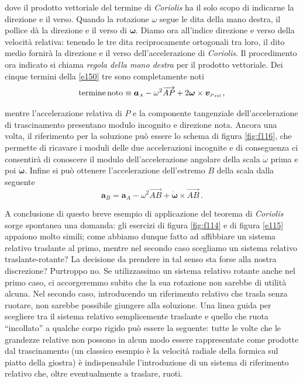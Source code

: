 \noindent dove il prodotto vettoriale del
termine di {\em Coriolis} ha il solo scopo di indicarne la direzione e il verso. 
Quando la rotazione $\omega$ segue 
le dita della mano destra, il pollice d\`a la direzione e il verso
di $\bm \omega$. Diamo  ora all'indice direzione e verso della velocit\`a
relativa: tenendo le tre dita reciprocamente ortogonali tra
loro, il dito medio fornir\`a la direzione e il verso
dell'accelerazione di {\em Coriolis}. Il procedimento ora indicato
si chiama {\em regola della mano destra}
per il prodotto vettoriale.
Dei cinque termini della \ref{e150} tre sono completamente noti
\begin{equation}
{\rm termine\, noto}\equiv
{{\bm a}_{\scriptscriptstyle{A}}}
-\omega^2 \overrightarrow{AP} + 
2{\bm \omega}\times
{{\bm v}_{\scriptscriptstyle{P}}}_{\scriptscriptstyle{{\rm rel}}}\,,
\label{e151}
\end{equation}

\noindent mentre l'accelerazione relativa di $P$ e la componente tangenziale dell'accelerazione di trascinamento presentano modulo incognito
e direzione nota.
Ancora una volta, il riferimento per la soluzione
pu\`o essere lo schema di figura \ref{fig:f116},
che permette di ricavare i moduli delle
due accelerazioni incognite e di conseguenza ci consentir\`a di conoscere
il modulo dell'accelerazione angolare della scala $\dot{\omega}$ prima e poi
$\dot{\bm\omega}$.
Infine si pu\`o ottenere l'accelerazione dell'estremo 
$B$ della scala dalla seguente
\begin{equation}
{{\bm a}_{\scriptscriptstyle{B}}}= 
{{\bm a}_{\scriptscriptstyle{A}}}
-\omega^2 \overrightarrow{AB} + \dot{\bm\omega}\times\overrightarrow{AB}\,.
\label{e152}
\end{equation}


\noindent A conclusione di questo breve esempio di applicazione del teorema di {\em Coriolis} sorge spontanea
una domanda: gli esercizi di figura \ref{fig:f114} e di figura \ref{e115}
appaiono molto simili; come abbiamo dunque fatto ad affibbiare un sistema
relativo traslante al primo, mentre nel secondo caso scegliamo un sistema
relativo traslante-rotante?
La decisione da prendere in tal senso sta forse alla nostra discrezione?
Purtroppo no. Se utilizzassimo
un sistema relativo rotante anche nel primo caso, ci accorgeremmo subito
che la sua rotazione non sarebbe di utilit\`a alcuna. 
Nel secondo caso, introducendo un riferimento relativo che trasla senza ruotare,
non sarebbe possibile giungere alla soluzione.
Una linea guida per scegliere tra il sistema relativo semplicemente traslante e quello
che ruota ``incollato'' a qualche corpo rigido pu\`o essere la 
seguente: tutte le volte che le grandezze relative non possono
in alcun modo essere rappresentate come prodotte dal trascinamento (un classico esempio
\`e la velocit\`a radiale della formica sul piatto della giostra)  \`e 
indispensabile l'introduzione di un sistema di riferimento relativo che, oltre eventualmente a traslare, ruoti.

